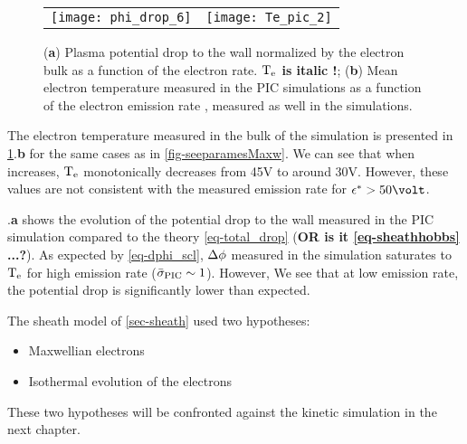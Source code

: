   \begin{figure}[hbtp]
    \centering
    \begin{tabular}{cc}
      \texttt{[image: phi\_drop\_6]}
      &
      \texttt{[image: Te\_pic\_2]}
    \end{tabular}
    \caption{({\bf a}) Plasma potential drop to the wall normalized by the electron bulk as a function of the electron rate. {\bf $\mathrm{T_e}$ is italic !}; ({\bf b}) Mean electron temperature measured in the \ac{PIC} simulations as a function of the electron emission rate \rate, measured as well in the simulations.  }
    \label{fig-Tevsproba}
  \end{figure}
  
  The electron temperature measured in the bulk of the simulation is presented in \cref{fig-Tevsproba}.{\bf b} for the same cases as in \cref{fig-seeparamesMaxw}.
  We can see that when \rate increases, $\mathrm{T_e}$ monotonically decreases from 45V to around 30V.
  However, these values are not consistent with the measured emission rate \ratepic for $\crover > 50\volt$.

  .{\bf a} shows the evolution of the potential drop to the wall measured in the \ac{PIC} simulation compared to the theory \vref{eq-total_drop} ({\bf OR is it \cref{eq-sheathhobbs} ...?}).
  As expected by \vref{eq-dphi_scl}, $\Delta \phi$ measured in the simulation saturates to $\mathrm{T_e}$ for high emission rate ($ \bar{\sigma }_{\rm PIC} \sim 1$).
  However, 
  We see that at low emission rate, the potential drop is significantly lower than expected.
  
  The sheath model of \cref{sec-sheath} used two hypotheses\string:
  \begin{itemize}
    \item Maxwellian electrons
    \item Isothermal evolution of the electrons
  \end{itemize}
  These two hypotheses will be confronted against the kinetic simulation in the next chapter.
  
  
   